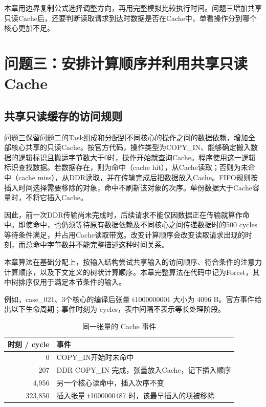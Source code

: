 \documentclass[anonymous,notoc]{gmcm2026}
\begin{document}
本章用边界复制公式选择调整方向，再用完整模拟比较执行时间。问题三增加共享只读Cache后，还要判断读取请求到达时数据是否在Cache中，单看操作分到哪个核心更加不足。


\section{问题三：安排计算顺序并利用共享只读Cache}

\subsection{共享只读缓存的访问规则}

问题三保留问题二的Task组成和分配到不同核心的操作之间的数据依赖，增加全部核心共享的只读Cache。按官方代码，操作类型为COPY\_IN、能够确定搬入数据的逻辑标识且搬运字节数大于0时，操作开始就查询Cache。程序使用这一逻辑标识查找数据。若数据存在，则为命中（cache hit），从Cache读取；否则为未命中（cache miss），从DDR读取，并在传输完成后把数据放入Cache。FIFO规则按插入时间选择需要移除的对象，命中不刷新该对象的次序。单份数据大于Cache容量时，不将它插入Cache。

因此，前一次DDR传输尚未完成时，后续请求不能仅因数据正在传输就算作命中。即使命中，也仍须等待原有数据依赖及不同核心之间传递数据时的500 cycles等待条件满足，并占用Cache读取带宽。改变计算顺序会改变读取请求出现的时刻，而总命中字节数并不能完整描述这种时间关系。

本章算法在基础分配上，按输入结构尝试共享输入的访问顺序、符合条件的注意力计算顺序，以及下文定义的树状计算顺序。本章完整算法在代码中记为Forest，其中树排序仅用于满足本节条件的输入。

例如，case\_021、3个核心的编译后张量 t1000000001 大小为 4096 B。官方事件给出以下生命周期；事件时刻为 cycles，表中间隔不表示等长处理阶段。

\begin{table}[!htbp]\centering
\caption{同一张量的 Cache 事件}\label{tab:cache-events}
\begin{tabularx}{\linewidth}{rX}\toprule
时刻 / cycle & 事件 \\\midrule
0 & COPY\_IN开始时未命中 \\
207 & DDR COPY\_IN 完成，张量放入Cache，记下插入顺序 \\
4,956 & 另一个核心读命中，插入次序不变 \\
323,850 & 插入张量 t1000000487 时，该最早插入的项被移除 \\\bottomrule
\end{tabularx}\end{table}
\end{document}
